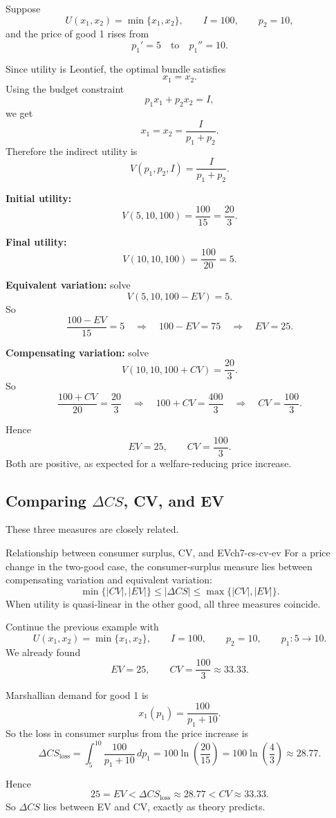 \begin{examplebox}[title={Worked Example: indirect utility, EV, and CV for perfect complements}]
Suppose
\[
U(x_1,x_2)=\min\{x_1,x_2\},
\qquad
I=100,
\qquad
p_2=10,
\]
and the price of good 1 rises from
\[
p_1'=5
\quad \text{to} \quad
p_1''=10.
\]

Since utility is Leontief, the optimal bundle satisfies
\[
x_1=x_2.
\]
Using the budget constraint
\[
p_1x_1+p_2x_2=I,
\]
we get
\[
x_1=x_2=\frac{I}{p_1+p_2}.
\]
Therefore the indirect utility is
\[
V(p_1,p_2,I)=\frac{I}{p_1+p_2}.
\]

\textbf{Initial utility:}
\[
V(5,10,100)=\frac{100}{15}=\frac{20}{3}.
\]

\textbf{Final utility:}
\[
V(10,10,100)=\frac{100}{20}=5.
\]

\textbf{Equivalent variation:} solve
\[
V(5,10,100-EV)=5.
\]
So
\[
\frac{100-EV}{15}=5
\quad \Longrightarrow \quad
100-EV=75
\quad \Longrightarrow \quad
EV=25.
\]

\textbf{Compensating variation:} solve
\[
V(10,10,100+CV)=\frac{20}{3}.
\]
So
\[
\frac{100+CV}{20}=\frac{20}{3}
\quad \Longrightarrow \quad
100+CV=\frac{400}{3}
\quad \Longrightarrow \quad
CV=\frac{100}{3}.
\]

Hence
\[
\boxed{EV=25, \qquad CV=\frac{100}{3}.}
\]
Both are positive, as expected for a welfare-reducing price increase.
\end{examplebox}

\subsection{Comparing \texorpdfstring{$\Delta CS$}{Delta CS}, CV, and EV}

These three measures are closely related.

\begin{theorem}{Relationship between consumer surplus, CV, and EV}{ch7-cs-cv-ev}
For a price change in the two-good case, the consumer-surplus measure lies between compensating variation and equivalent variation:
\[
\min\{|CV|,|EV|\} \le |\Delta CS| \le \max\{|CV|,|EV|\}.
\]
When utility is quasi-linear in the other good, all three measures coincide.
\end{theorem}

\begin{examplebox}[title={Worked Example: comparing the three welfare measures}]
Continue the previous example with
\[
U(x_1,x_2)=\min\{x_1,x_2\},
\qquad
I=100,
\qquad
p_2=10,
\qquad
p_1: 5 \to 10.
\]
We already found
\[
EV=25,
\qquad
CV=\frac{100}{3}\approx 33.33.
\]

Marshallian demand for good 1 is
\[
x_1(p_1)=\frac{100}{p_1+10}.
\]
So the loss in consumer surplus from the price increase is
\[
\Delta CS_{\text{loss}}
=
\int_{5}^{10}\frac{100}{p_1+10}\,dp_1
=
100\ln\left(\frac{20}{15}\right)
=
100\ln\left(\frac{4}{3}\right)
\approx 28.77.
\]

Hence
\[
25 = EV < \Delta CS_{\text{loss}} \approx 28.77 < CV \approx 33.33.
\]
So $\Delta CS$ lies between EV and CV, exactly as theory predicts.
\end{examplebox}

